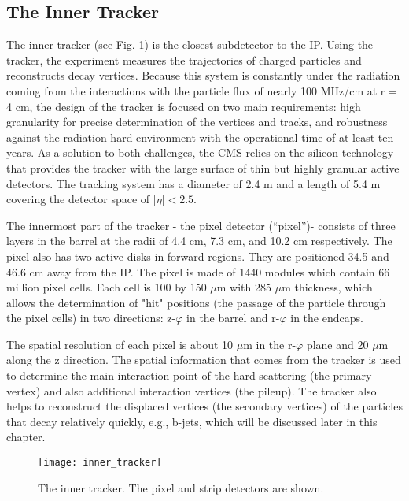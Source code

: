 \begin{normalsize}

\subsection{The Inner Tracker}

The inner tracker \cite{Tracker_phase2} (see Fig. \ref{inner_tracker}) is the closest subdetector to the IP. Using the tracker, the experiment measures the trajectories of charged particles and reconstructs decay vertices. Because this system is constantly under the radiation coming from the interactions with the particle flux of nearly 100 MHz/cm at r = 4 cm, the design of the tracker is focused on two main requirements: high granularity for precise determination of the vertices and tracks, and robustness against the radiation-hard environment with the operational time of at least ten years. As a solution to both challenges, the CMS relies on the silicon technology that provides the tracker with the large surface of thin but highly granular active detectors. The tracking system has a diameter of 2.4 m and a length of 5.4 m covering the detector space of $|\eta|< 2.5$. 

The innermost part of the tracker - the pixel detector (``pixel'')- consists of three layers in the barrel at the radii of 4.4 cm, 7.3 cm, and 10.2 cm respectively. The pixel also has two active disks in forward regions. They are positioned 34.5 and 46.6 cm away from the IP. The pixel is made of 1440 modules which contain 66 million pixel cells. Each cell is 100 by 150 $\mu$m with 285 $\mu$m thickness, which allows the determination of "hit" positions (the passage of the particle through the pixel cells) in two directions: z-$\varphi$ in the barrel and r-$\varphi$ in the endcaps.

The spatial resolution of each pixel is about 10 $\mu$m in the r-$\varphi$ plane and 20 $\mu$m along the z direction. The spatial information that comes from the tracker is used to determine the main interaction point of the hard scattering (the primary vertex) and also additional interaction vertices (the pileup). The tracker also helps to reconstruct the displaced vertices (the secondary vertices) of the particles that decay relatively quickly, e.g., b-jets, which will be discussed later in this chapter. 




\begin{figure}[h!]
  \centering
  \texttt{[image: inner\_tracker]}
  \caption[The inner tracker]{The inner tracker. The pixel and strip detectors are shown. }
  \label{inner_tracker}
\end{figure}



\end{normalsize}
